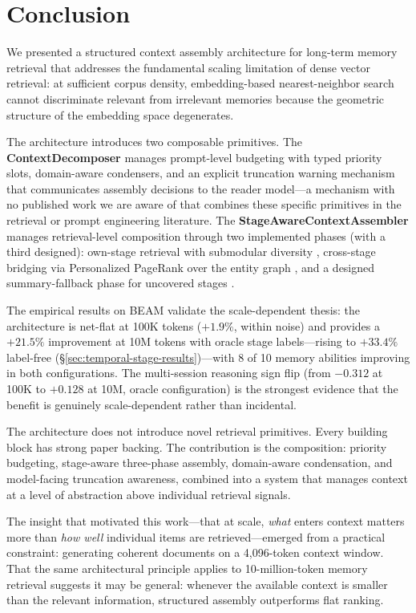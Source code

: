\documentclass[11pt]{article}
\begin{document}
\section{Conclusion}
\label{sec:conclusion}

We presented a structured context assembly architecture for long-term
memory retrieval that addresses the fundamental scaling limitation of
dense vector retrieval: at sufficient corpus density, embedding-based
nearest-neighbor search cannot discriminate relevant from irrelevant
memories because the geometric structure of the embedding space
degenerates.

The architecture introduces two composable primitives.  The
\textbf{ContextDecomposer} manages prompt-level budgeting with typed
priority slots, domain-aware condensers, and an explicit truncation
warning mechanism that communicates assembly decisions to the reader
model---a mechanism with no published work we are aware of that combines these specific primitives in the retrieval or
prompt engineering literature.  The \textbf{StageAwareContextAssembler}
manages retrieval-level composition through two implemented phases
(with a third designed): own-stage
retrieval with submodular diversity \citep{Krause2008}, cross-stage
bridging via Personalized PageRank over the entity graph
\citep{Gutierrez2024}, and a designed summary-fallback phase for
uncovered stages \citep{Tse2007}.

The empirical results on BEAM validate the scale-dependent thesis:
the architecture is net-flat at 100K tokens ($+1.9\%$, within noise)
and provides a $+21.5\%$ improvement at 10M tokens with oracle stage
labels---rising to $+33.4\%$ label-free
(\S\ref{sec:temporal-stage-results})---with 8 of 10 memory abilities
improving in both configurations.  The multi-session reasoning sign
flip (from $-0.312$ at 100K to $+0.128$ at 10M, oracle
configuration) is the strongest evidence that the benefit is
genuinely scale-dependent rather than incidental.

The architecture does not introduce novel retrieval primitives.
Every building block has strong paper backing.  The contribution is
the composition: priority budgeting, stage-aware three-phase assembly,
domain-aware condensation, and model-facing truncation awareness,
combined into a system that manages context at a level of abstraction
above individual retrieval signals.

The insight that motivated this work---that at scale, \emph{what}
enters context matters more than \emph{how well} individual items are
retrieved---emerged from a practical constraint: generating coherent
documents on a 4,096-token context window.  That the same
architectural principle applies to 10-million-token memory retrieval
suggests it may be general: whenever the available context is smaller
than the relevant information, structured assembly outperforms flat
ranking.
\end{document}
